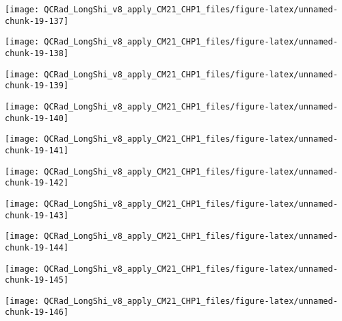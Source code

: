 \documentclass[
  10pt,
  a4paper,oneside]{article}
\begin{document}
\begin{center}\texttt{[image: QCRad\_LongShi\_v8\_apply\_CM21\_CHP1\_files/figure-latex/unnamed-chunk-19-137]} \end{center}

\begin{center}\texttt{[image: QCRad\_LongShi\_v8\_apply\_CM21\_CHP1\_files/figure-latex/unnamed-chunk-19-138]} \end{center}

\begin{center}\texttt{[image: QCRad\_LongShi\_v8\_apply\_CM21\_CHP1\_files/figure-latex/unnamed-chunk-19-139]} \end{center}

\begin{center}\texttt{[image: QCRad\_LongShi\_v8\_apply\_CM21\_CHP1\_files/figure-latex/unnamed-chunk-19-140]} \end{center}

\begin{center}\texttt{[image: QCRad\_LongShi\_v8\_apply\_CM21\_CHP1\_files/figure-latex/unnamed-chunk-19-141]} \end{center}

\begin{center}\texttt{[image: QCRad\_LongShi\_v8\_apply\_CM21\_CHP1\_files/figure-latex/unnamed-chunk-19-142]} \end{center}

\begin{center}\texttt{[image: QCRad\_LongShi\_v8\_apply\_CM21\_CHP1\_files/figure-latex/unnamed-chunk-19-143]} \end{center}

\begin{center}\texttt{[image: QCRad\_LongShi\_v8\_apply\_CM21\_CHP1\_files/figure-latex/unnamed-chunk-19-144]} \end{center}

\begin{center}\texttt{[image: QCRad\_LongShi\_v8\_apply\_CM21\_CHP1\_files/figure-latex/unnamed-chunk-19-145]} \end{center}

\begin{center}\texttt{[image: QCRad\_LongShi\_v8\_apply\_CM21\_CHP1\_files/figure-latex/unnamed-chunk-19-146]} \end{center}
\end{document}
